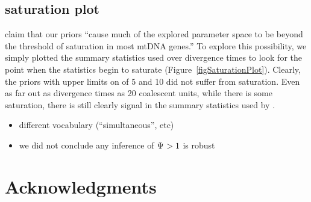 \documentclass[letterpaper,12pt]{article}
\begin{document}
\begin{linenumbers}
\subsection*{saturation plot}
\citet{Hickerson2013} claim that our priors ``cause much of the explored
parameter space to be beyond the threshold of saturation in most mtDNA genes.''
To explore this possibility, we simply plotted the summary statistics used
over divergence times to look for the point when the statistics begin to
saturate (Figure~\ref{figSaturationPlot}).
Clearly, the priors with upper limits on \divt{} of 5 and 10 did not
suffer from saturation.
Even as far out as divergence times as 20 coalescent units, while 
there is some saturation, there is still clearly signal in the
summary statistics used by \msb.

\begin{itemize}
    \item different vocabulary (``simultaneous'', etc)
    \item we did not conclude any inference of $\Psi_{} > 1$ is robust
\end{itemize}

\section*{Acknowledgments}

% 


\newpage
\singlespacing

\renewcommand\listfigurename{Figure Captions}
\renewcommand\cftdotsep{\cftnodots}
\setlength\cftbeforefigskip{10pt}
\listoffigures


\end{linenumbers}

\newpage
\singlespacing
\end{document}
